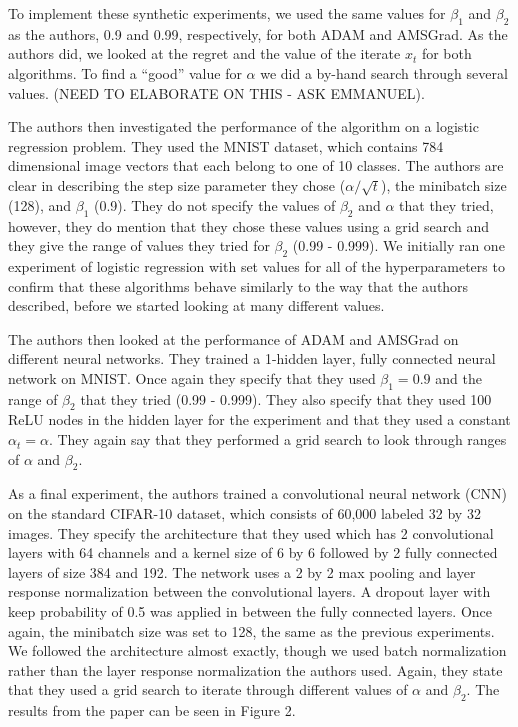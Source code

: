 \documentclass[letterpaper, 10 pt, conference]{ieeeconf}  %
\begin{document}
To implement these synthetic experiments, we used the same values for $\beta_{1}$ and $\beta_{2}$ as the authors, 0.9 and 0.99, respectively, for both ADAM and AMSGrad. As the authors did, we looked at the regret and the value of the iterate $x_{t}$ for both algorithms. To find a ``good'' value for $\alpha$ we did a by-hand search through several values. (NEED TO ELABORATE ON THIS - ASK EMMANUEL). \par
The authors then investigated the performance of the algorithm on a logistic regression problem. They used the MNIST dataset, which contains 784 dimensional image vectors that each belong to one of 10 classes. The authors are clear in describing the step size parameter they chose ($\alpha / \sqrt{t}$), the minibatch size (128), and $\beta_{1}$ (0.9). They do not specify the values of $\beta_{2}$ and $\alpha$ that they tried, however, they do mention that they chose these values using a grid search and they give the range of values they tried for $\beta_{2}$ (0.99 - 0.999). We initially ran one experiment of logistic regression with set values for all of the hyperparameters to confirm that these algorithms behave similarly to the way that the authors described, before we started looking at many different values. \par
The authors then looked at the performance of ADAM and AMSGrad on different neural networks. They trained a 1-hidden layer, fully connected neural network on MNIST. Once again they specify that they used $\beta_{1} = 0.9$ and the range of $\beta_{2}$ that they tried (0.99 - 0.999). They also specify that they used 100 ReLU nodes in the hidden layer for the experiment and that they used a constant $\alpha_{t} = \alpha$. They again say that they performed a grid search to look through ranges of $\alpha$ and $\beta_{2}$. \par
As a final experiment, the authors trained a convolutional neural network (CNN) on the standard CIFAR-10 dataset, which consists of 60,000 labeled 32 by 32 images. They specify the architecture that they used which has 2 convolutional layers with 64 channels and a kernel size of 6 by 6 followed by 2 fully connected layers of size 384 and 192. The network uses a 2 by 2 max pooling and layer response normalization between the convolutional layers. A dropout layer with keep probability of 0.5 was applied in between the fully connected layers. Once again, the minibatch size was set to 128, the same as the previous experiments. We followed the architecture almost exactly, though we used batch normalization rather than the layer response normalization the authors used. Again, they state that they used a grid search to iterate through different values of $\alpha$ and $\beta_{2}$. The results from the paper can be seen in Figure 2. \par
\end{document}
